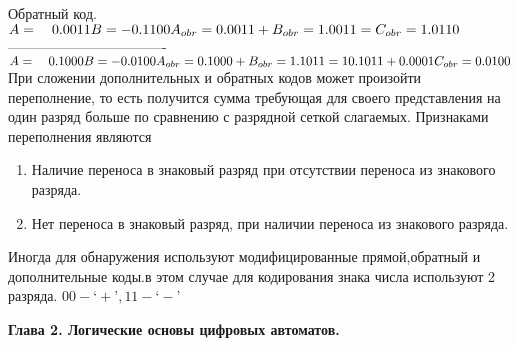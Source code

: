 Обратный код.\\
$
A =\quad 0.0011 \\
B =-0.1100  \\
A_{obr} = 0.0011  \\
+  \\
B_{obr} = 1.0011 \\
=  \\
C_{obr} = 1.0110
$\\
----------------------------------\\
$
A =\quad 0.1000 \\
B =-0.0100  \\
A_{obr} = 0.1000  \\
+  \\
B_{obr} = 1.1011 \\
=  \\
10.1011 \\
+\\
0.0001\\
C_{obr} = 0.0100  \\
$
При сложении дополнительных и обратных кодов может произойти переполнение, то есть получится сумма требующая для своего представления на один разряд больше по сравнению с разрядной сеткой слагаемых.
Признаками переполнения являются
\begin{enumerate}
  \item Наличие переноса в знаковый разряд при отсутствии переноса из знакового разряда.
  \item Нет переноса в знаковый разряд, при наличии переноса из знакового разряда.
\end{enumerate}
Иногда для обнаружения используют модифицированные прямой,обратный и дополнительные коды.в этом случае для кодирования знака числа используют 2 разряда. $00 - ‘+’ , 11 - ‘-’$

\Large{ \textbf {Глава 2. Логические основы цифровых автоматов.}} \\

